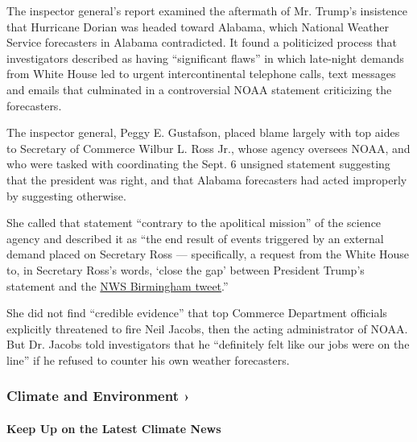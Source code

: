 The inspector general's report examined the aftermath of Mr. Trump's
insistence that Hurricane Dorian was headed toward Alabama, which
National Weather Service forecasters in Alabama contradicted. It found a
politicized process that investigators described as having ``significant
flaws'' in which late-night demands from White House led to urgent
intercontinental telephone calls, text messages and emails that
culminated in a controversial NOAA statement criticizing the
forecasters.

The inspector general, Peggy E. Gustafson, placed blame largely with top
aides to Secretary of Commerce Wilbur L. Ross Jr., whose agency oversees
NOAA, and who were tasked with coordinating the Sept. 6 unsigned
statement suggesting that the president was right, and that Alabama
forecasters had acted improperly by suggesting otherwise.

She called that statement ``contrary to the apolitical mission'' of the
science agency and described it as ``the end result of events triggered
by an external demand placed on Secretary Ross --- specifically, a
request from the White House to, in Secretary Ross's words, `close the
gap' between President Trump's statement and the
\href{https://www.nytimes3xbfgragh.onion/2019/11/07/climate/trump-alabama-sharpie-hurricane.html}{NWS
Birmingham tweet}.''

She did not find ``credible evidence'' that top Commerce Department
officials explicitly threatened to fire Neil Jacobs, then the acting
administrator of NOAA. But Dr. Jacobs told investigators that he
``definitely felt like our jobs were on the line'' if he refused to
counter his own weather forecasters.

\href{https://www.nytimes3xbfgragh.onion/section/climate?action=click\&pgtype=Article\&state=default\&region=MAIN_CONTENT_1\&context=storylines_keepup}{}

\hypertarget{climate-and-environment-}{%
\subsubsection{Climate and Environment
›}\label{climate-and-environment-}}

\hypertarget{keep-up-on-the-latest-climate-news}{%
\paragraph{Keep Up on the Latest Climate
News}\label{keep-up-on-the-latest-climate-news}}

